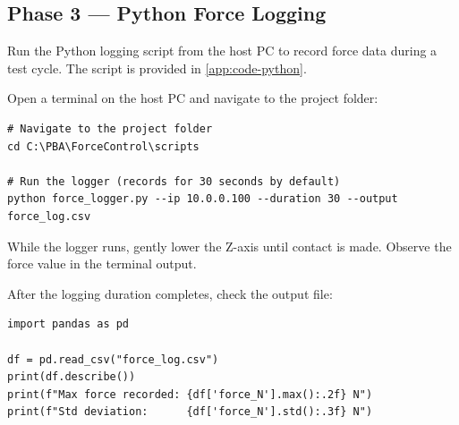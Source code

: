 \subsection{Phase 3 — Python Force Logging}
\label{sec:proc:phase3}

Run the Python logging script from the host PC to record force data during
a test cycle.  The script is provided in \cref{app:code-python}.

\begin{steplist}

  \step Open a terminal on the host PC and navigate to the project folder:

        \begin{pythoncode}
\begin{lstlisting}
# Navigate to the project folder
cd C:\PBA\ForceControl\scripts

# Run the logger (records for 30 seconds by default)
python force_logger.py --ip 10.0.0.100 --duration 30 --output force_log.csv
\end{lstlisting}
        \end{pythoncode}

  \step While the logger runs, gently lower the Z-axis until contact is
        made.  Observe the force value in the terminal output.

  \step After the logging duration completes, check the output file:

        \begin{pythoncode}
\begin{lstlisting}
import pandas as pd

df = pd.read_csv("force_log.csv")
print(df.describe())
print(f"Max force recorded: {df['force_N'].max():.2f} N")
print(f"Std deviation:      {df['force_N'].std():.3f} N")
\end{lstlisting}
        \end{pythoncode}

\end{steplist}


